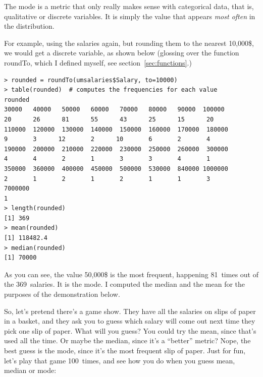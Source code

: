\documentclass{report}
\newcommand{\code}[1]{\textsf{\ttfamily #1}}
\begin{document}
		The mode is a metric that only really makes sense with categorical data, that is, qualitative or discrete variables. It is simply the value that appears \emph{most often} in the distribution.
		
		For example, using the salaries again, but rounding them to the nearest 10,000\$, we would get a discrete variable, as shown below (glossing over the function \code{roundTo}, which I defined myself, see section~\ref{sec:functions}.)
		
		\begin{verbatim}
> rounded = roundTo(umsalaries$Salary, to=10000)
> table(rounded)  # computes the frequencies for each value
rounded
30000   40000   50000   60000   70000   80000   90000  100000 
20      26      81      55      43      25      15      20 
110000  120000  130000  140000  150000  160000  170000  180000 
9       3      12       2      10       6       2       4 
190000  200000  210000  220000  230000  250000  260000  300000 
4       4       2       1       3       3       4       1 
350000  360000  400000  450000  500000  530000  840000 1000000 
2       1       2       1       2       1       1       3 
7000000 
1 
> length(rounded)
[1] 369
> mean(rounded)
[1] 118482.4
> median(rounded)
[1] 70000
		\end{verbatim}
		
		As you can see, the value 50,000\$ is the most frequent, happening 81~times out of the 369~salaries. It is the mode. I computed the median and the mean for the purposes of the demonstration below.
		
		So, let's pretend there's a game show. They have all the salaries on slips of paper in a basket, and they ask you to guess which salary will come out next time they pick one slip of paper.  What will you guess? You could try the mean, since that's used all the time. Or maybe the median, since it's a ``better'' metric? Nope, the best guess is the mode, since it's the most frequent slip of paper. Just for fun, let's play that game 100~times, and see how you do when you guess mean, median or mode:
		
\end{document}
